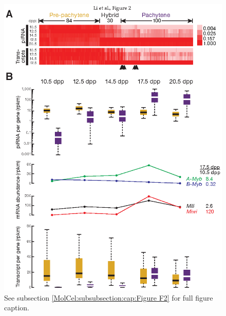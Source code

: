     \begin{figure} %
      \centering 
      \includegraphics{Figures/MolCel/MolCel2013_Fig2.eps}
      \caption[Three Classes of piRNA-Generating Loci]
      {
        See subsection \ref{MolCel:subsubsection:cap:Figure F2} for full figure caption.
        }
      \label{MolCel:fig:MolCelF2}
      \end{figure}

